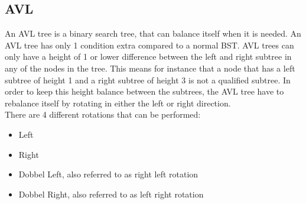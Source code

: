 \subsection{AVL}
An AVL tree is a binary search tree, that can balance itself when it is needed. An AVL tree has only 1 condition extra compared to a normal BST. AVL trees can only have a height of 1 or lower difference between the left and right subtree in any of the nodes in the tree. This means for instance that a node that has a left subtree of height 1 and a right subtree of height 3 is not a qualified subtree. In order to keep this height balance between the subtrees, the AVL tree have to rebalance itself by rotating in either the left or right direction.\cite{BinaryTree,AVLTreeRotation:Insertion} \\[11pt]
There are 4 different rotations that can be performed:
\begin{itemize}
	\item{Left}
	\item{Right}
	\item{Dobbel Left, also referred to as right left rotation}
	\item{Dobbel Right, also referred to as left right rotation}
\end{itemize}
